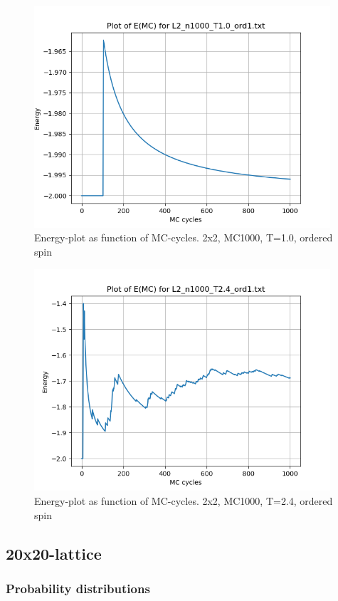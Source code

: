 \documentclass{article}
\begin{document}
\begin{figure}[ht]
    \centering
    \includegraphics[width = 11cm]{img/energy_L2_n1000_T10_ord1.png}
    \caption{Energy-plot as function of MC-cycles. 2x2, MC1000, T=1.0, ordered spin}
    \label{fig:energy_L2_n1000_T1.0_ord1}
  \end{figure}

\begin{figure}[ht]
    \centering
    \includegraphics[width = 11cm]{img/energy_L2_n1000_T24_ord1.png}
    \caption{Energy-plot as function of MC-cycles. 2x2, MC1000, T=2.4, ordered spin}
    \label{fig:energy_L2_n1000_T2.4_ord1}
  \end{figure}

\subsection{20x20-lattice}

\subsubsection{Probability distributions}
\end{document}
